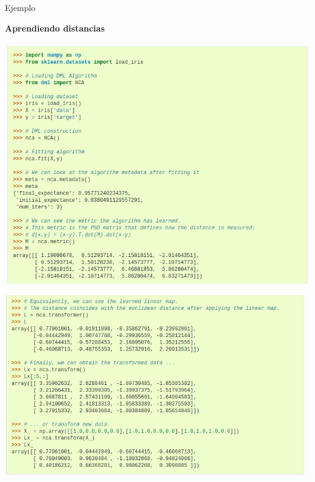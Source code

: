 \documentclass[10pt, compress]{beamer}
\begin{document}
\begin{frame}{Ejemplo}
  \begin{center}\textbf{Aprendiendo distancias}\end{center}
  \begin{minipage}[t]{0.48\textwidth}
      \centering\includegraphics[width=\textwidth]{images/ex_dml1.png}
  \end{minipage}
  \hfill
  \begin{minipage}[t]{0.48\textwidth}
      \centering\includegraphics[width=\textwidth]{images/ex_dml2.png}
  \end{minipage}
\end{frame}
\end{document}
